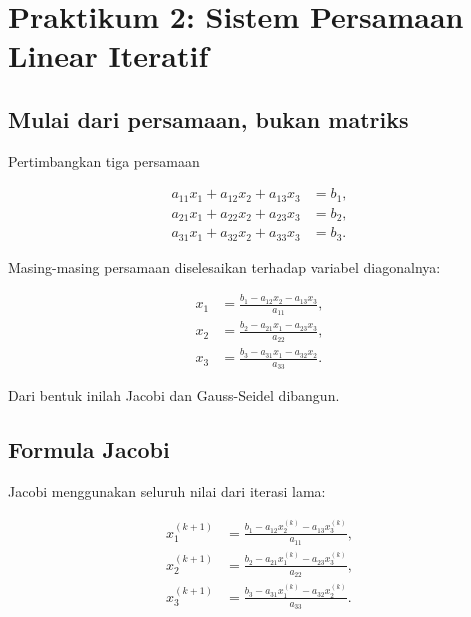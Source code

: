 \chapter{Praktikum 2: Sistem Persamaan Linear Iteratif}



\section{Mulai dari persamaan, bukan matriks}

Pertimbangkan tiga persamaan

\begin{align}
a_{11}x_1+a_{12}x_2+a_{13}x_3 &= b_1,\\
a_{21}x_1+a_{22}x_2+a_{23}x_3 &= b_2,\\
a_{31}x_1+a_{32}x_2+a_{33}x_3 &= b_3.
\end{align}

Masing-masing persamaan diselesaikan terhadap variabel diagonalnya:

\begin{align}
x_1 &=
\frac{b_1-a_{12}x_2-a_{13}x_3}{a_{11}},\\
x_2 &=
\frac{b_2-a_{21}x_1-a_{23}x_3}{a_{22}},\\
x_3 &=
\frac{b_3-a_{31}x_1-a_{32}x_2}{a_{33}}.
\end{align}

Dari bentuk inilah Jacobi dan Gauss-Seidel dibangun.

\section{Formula Jacobi}

Jacobi menggunakan seluruh nilai dari iterasi lama:

\begin{align}
x_1^{(k+1)}
&=
\frac{b_1-a_{12}x_2^{(k)}-a_{13}x_3^{(k)}}{a_{11}},\\
x_2^{(k+1)}
&=
\frac{b_2-a_{21}x_1^{(k)}-a_{23}x_3^{(k)}}{a_{22}},\\
x_3^{(k+1)}
&=
\frac{b_3-a_{31}x_1^{(k)}-a_{32}x_2^{(k)}}{a_{33}}.
\end{align}

